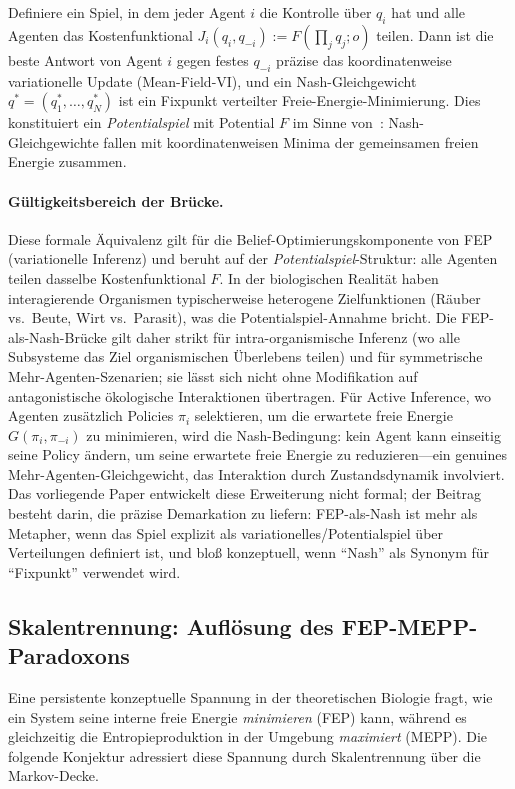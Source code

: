 \documentclass[12pt,a4paper]{article}
\theoremstyle{remark}
\begin{document}
Definiere ein Spiel, in dem jeder Agent $i$ die Kontrolle über $q_i$ hat und alle Agenten das Kostenfunktional $J_i(q_i, q_{-i}) := F(\prod_j q_j; o)$ teilen. Dann ist die beste Antwort von Agent $i$ gegen festes $q_{-i}$ präzise das koordinatenweise variationelle Update (Mean-Field-VI), und ein Nash-Gleichgewicht $q^* = (q_1^*, \dots, q_N^*)$ ist ein Fixpunkt verteilter Freie-Energie-Minimierung. Dies konstituiert ein \emph{Potentialspiel} mit Potential $F$ im Sinne von~\citet{MondererShapley1996}: Nash-Gleichgewichte fallen mit koordinatenweisen Minima der gemeinsamen freien Energie zusammen.

\paragraph{Gültigkeitsbereich der Brücke.} Diese formale Äquivalenz gilt für die Belief-Optimierungskomponente von FEP (variationelle Inferenz) und beruht auf der \emph{Potentialspiel}-Struktur: alle Agenten teilen dasselbe Kostenfunktional $F$. In der biologischen Realität haben interagierende Organismen typischerweise heterogene Zielfunktionen (Räuber vs.\ Beute, Wirt vs.\ Parasit), was die Potentialspiel-Annahme bricht. Die FEP-als-Nash-Brücke gilt daher strikt für intra-organismische Inferenz (wo alle Subsysteme das Ziel organismischen Überlebens teilen) und für symmetrische Mehr-Agenten-Szenarien; sie lässt sich nicht ohne Modifikation auf antagonistische ökologische Interaktionen übertragen. Für Active Inference, wo Agenten zusätzlich Policies $\pi_i$ selektieren, um die erwartete freie Energie $G(\pi_i, \pi_{-i})$ zu minimieren, wird die Nash-Bedingung: kein Agent kann einseitig seine Policy ändern, um seine erwartete freie Energie zu reduzieren---ein genuines Mehr-Agenten-Gleichgewicht, das Interaktion durch Zustandsdynamik involviert. Das vorliegende Paper entwickelt diese Erweiterung nicht formal; der Beitrag besteht darin, die präzise Demarkation zu liefern: FEP-als-Nash ist mehr als Metapher, wenn das Spiel explizit als variationelles/Potentialspiel über Verteilungen definiert ist, und bloß konzeptuell, wenn ``Nash'' als Synonym für ``Fixpunkt'' verwendet wird.

\subsection{Skalentrennung: Auflösung des FEP-MEPP-Paradoxons}
\label{sec:fep-mepp-paradox}

Eine persistente konzeptuelle Spannung in der theoretischen Biologie fragt, wie ein System seine interne freie Energie \emph{minimieren} (FEP) kann, während es gleichzeitig die Entropieproduktion in der Umgebung \emph{maximiert} (MEPP). Die folgende Konjektur adressiert diese Spannung durch Skalentrennung über die Markov-Decke.
\end{document}
